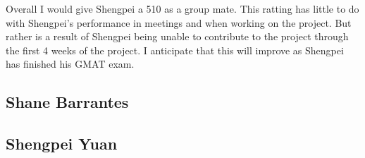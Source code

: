 \documentclass[onecolumn, draftclsnofoot,10pt, compsoc]{article}
\begin{document}
		Overall I would give Shengpei a 5\/10 as a group mate. This ratting has little to do with Shengpei's performance in meetings and when working on the project. But rather is a result of Shengpei being unable to contribute to the project through the first 4 weeks of the project. I anticipate that this will improve as Shengpei has finished his GMAT exam.\\
		
		
		
		

\subsection{Shane Barrantes}

\subsection{Shengpei Yuan}
\end{document}
